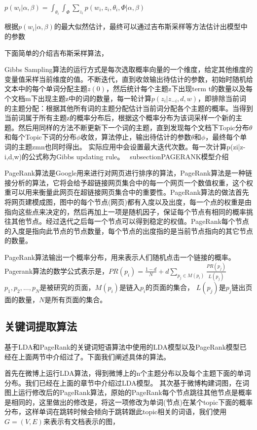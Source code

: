 \documentclass[master]{njuthesis}
\begin{document}
    $p(w_i | \alpha, \beta)  = \int_{\theta_i}\int_{\Phi }\sum_{z_i}p(w_i, z_i, \theta_i, \Phi | \alpha, \beta)$

    根据$p(w_i | \alpha, \beta)$的最大似然估计，最终可以通过吉布斯采样等方法估计出模型中的参数

    下面简单的介绍吉布斯采样算法，
    
    Gibbs Sampling算法的运行方式是每次选取概率向量的一个维度，给定其他维度的变量值采样当前维度的值。不断迭代，直到收敛输出待估计的参数，初始时随机给文本中的每个单词分配主题$z\left(0\right)$，然后统计每个主题z下出现term t的数量以及每个文档m下出现主题z中的词的数量，每一轮计算$p\left(z_i|z_{-i},d,w\right)$，即排除当前词的主题分配：根据其他所有词的主题分配估计当前词分配各个主题的概率。当得到当前词属于所有主题z的概率分布后，根据这个概率分布为该词采样一个新的主题。然后用同样的方法不断更新下一个词的主题，直到发现每个文档下Topic分布$\theta$和每个Topic下词的分布$\phi$收敛，算法停止，输出待估计的参数$\theta$和$\phi$，最终每个单词的主题zmn也同时得出。
实际应用中会设置最大迭代次数。每一次计算p(zi|z-i,d,w)的公式称为Gibbs updating rule。
\
subsection{PAGERANK模型介绍}

PageRank算法是Google用来进行对网页进行排序的算法，PageRank算法是一种链接分析的算法，它将会给予超链接网页集合中的每一个网页一个数值权重，这个权重可以用来衡量此网页在超链接网页集合中的重要性。PageRank算法的做法首先将网页建模成图，图中的每个节点(网页)都有入度以及出度，每一个点的权重是由指向这些点来决定的，然后再加上一项是随机因子，保证每个节点有相同的概率挑往其他节点。经过迭代之后每一个节点可以得到稳定的权值。PageRank每个节点的入度是指向此节点的节点数量，每个节点的出度指的是当前节点指向的其它节点的数量。

PageRank算法输出一个概率分布，用来表示人们随机点击一个链接的概率。Pagerank算法的数学公式表示是，$ PR\left(p_i\right) = \frac{1-d}{N}+d\sum_{p_j \in M\left(p_i\right)} \frac{PR\left(p_j\right)}{L\left(p_j\right)}$$p_1,p_2,...,p_N$是被研究的页面，$M\left(p_i\right)$是链入$p_i$的页面的集合， $L\left(p_j\right)$是$p_j$链出页面的数量，$N$是所有页面的集合。

\subsection{关键词提取算法}

基于LDA和PageRank的关键词短语算法中使用的LDA模型以及PageRank模型已经在上面两节中介绍过了。下面我们阐述具体的算法。

首先在微博上运行LDA算法，得到微博上的n个主题分布以及每个主题下面的单词分布。我们已经在上面的章节中介绍过LDA模型。
其次基于微博构建词图，在词图上运行修改后的PageRank算法，原始的PageRank每个节点跳往其他节点是概率是相同的，这里做出的修改是，将这一项修改为单词(节点)在某个topic下面的概率分布，这样单词在跳转时候会倾向于跳转跟此topic相关的词语，我们使用$G=\left(V,E\right)$来表示有文档表示的图，
\end{document}
